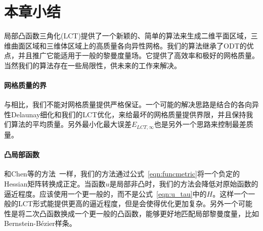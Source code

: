 \section{本章小结}
局部凸函数三角化(LCT)提供了一个新颖的、简单的算法来生成二维平面区域，三维曲面区域和三维体区域上的高质量各向异性网格。我们的算法继承了ODT的优点，并且推广它能适用于一般的黎曼度量场。它提供了高效率和极好的网格质量。当然我们的算法存在一些局限性，供未来的工作来解决。

\paragraph{网格质量的界}
与\cite{Labelle2003,Boissonnat2008a}相比，我们不能对网格质量提供严格保证。一个可能的解决思路是结合\cite{Boissonnat2008a}的各向异性Delaunay细化和我们的LCT优化，来给最坏的网格质量提供界限，并且保持我们算法的平均质量。另外最小化最大误差$E_{LCT,\infty}$也是另外一个思路来控制最差质量。

\paragraph{凸局部函数}
和Chen等的方法~\cite{Chen2007}一样，我们的方法通过公式~\ref{eqn:funcmetric}将一个负定的Hessian矩阵转换成正定。当函数$u$是局部非凸时，我们的方法会降低对原始函数的逼近程度。应该使用一个更一般的，而不是公式~\ref{eqn:u_tau}中的$H$。这样一个一般的LCT形式能提供更高的逼近程度，但是会使得优化更加复杂。另外一个可能性是将二次凸函数换成一个更一般的凸函数，能够更好地匹配局部黎曼度量，比如Bernstein-B\'{e}zier样条。




